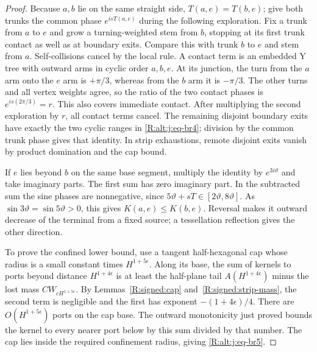 \begin{proof}
Because $a,b$ lie on the same straight side, $T(a,e)=T(b,e)$; give both
trunks the common phase $e^{isT(a,e)}$ during the following exploration.
Fix a trunk from $a$ to $e$ and grow a turning-weighted stem from $b$,
stopping at its first trunk contact as well as at boundary exits. Compare
this with trunk $b$ to $e$ and stem from $a$. Self-collisions cancel by
the local rule. A contact term is an embedded Y tree with outward arms
in cyclic order $a,b,e$. At its junction, the turn from the $a$ arm onto
the $e$ arm is $+\pi/3$, whereas from the $b$ arm it is $-\pi/3$.
The other turns and all vertex weights agree, so the ratio of the two
contact phases is $e^{is(2\pi/3)}=r$. This also covers immediate contact.
After multiplying the second exploration by $r$, all contact terms cancel.
The remaining disjoint boundary exits have exactly the two cyclic ranges
in \eqref{R:alt:j:eq-br4}; division by the common trunk phase gives that
identity. In strip exhaustions, remote disjoint exits vanish by product
domination and the cap bound.

If $e$ lies beyond $b$ on the same base segment, multiply the identity
by $e^{3i\vartheta}$ and take imaginary parts. The first sum has zero
imaginary part. In the subtracted sum the sine phases are nonnegative,
since $5\vartheta+sT\in[2\vartheta,8\vartheta]$. As
$\sin3\vartheta=\sin5\vartheta>0$, this gives $K(a,e)\le K(b,e)$.
Reversal makes it outward decrease of the terminal from a fixed source;
a tessellation reflection gives the other direction.

To prove the confined lower bound, use a tangent half-hexagonal cap
whose radius is a small constant times $H^{1+5\epsilon}$. Along its base,
the sum of kernels to ports beyond distance $H^{1+4\epsilon}$ is at least
the half-plane tail $A(H^{1+4\epsilon})$ minus the lost mass
$CW_{cH^{1+5\epsilon}}$. By Lemmas~\ref{R:signed:cap}
and~\ref{R:signed:strip-mass}, the second term is negligible and the first
has exponent $-(1+4\epsilon)/4$. There are $O(H^{1+5\epsilon})$ ports
on the cap base. The outward monotonicity just proved bounds the kernel
to every nearer port below by this sum divided by that number. The cap
lies inside the required confinement radius, giving
\eqref{R:alt:j:eq-br5}.
\end{proof}


